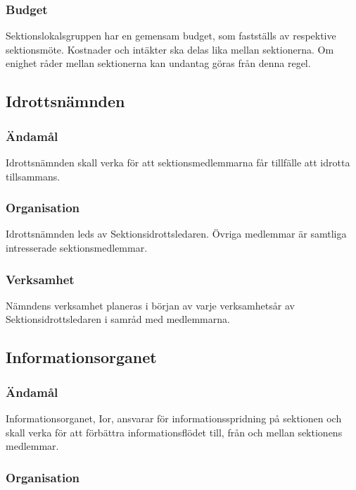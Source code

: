 \documentclass{dgovdoc}
\begin{document}
\subsubsection{Budget}

Sektionslokalsgruppen har en gemensam budget, som fastställs av respektive
sektionsmöte. Kostnader och intäkter ska delas lika mellan sektionerna. Om
enighet råder mellan sektionerna kan undantag göras från denna regel.

\subsection{Idrottsnämnden}

\subsubsection{Ändamål}

Idrottsnämnden skall verka för att sektionsmedlemmarna får tillfälle att
idrotta tillsammans.

\subsubsection{Organisation}

Idrottsnämnden leds av Sektionsidrottsledaren. Övriga medlemmar är samtliga
intresserade sektionsmedlemmar.

\subsubsection{Verksamhet}

Nämndens verksamhet planeras i början av varje verksamhetsår av
Sektionsidrottsledaren i samråd med medlemmarna.

\subsection{Informationsorganet}

\subsubsection{Ändamål}

Informationsorganet, Ior, ansvarar för informationsspridning på sektionen och
skall verka för att förbättra informationsflödet till, från och mellan
sektionens medlemmar.

\subsubsection{Organisation}
\end{document}
